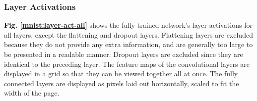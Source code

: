 \subsubsection{Layer Activations}

\textbf{Fig. \ref{mnist:layer-act-all}} shows the fully trained network's layer activations for all layers, except the flattening and dropout layers. Flattening layers are excluded because they do not provide any extra information, and are generally too large to be presented in a readable manner. Dropout layers are excluded since they are identical to the preceding layer. The feature maps of the convolutional layers are displayed in a grid so that they can be viewed together all at once. The fully connected layers are displayed as pixels laid out horizontally, scaled to fit the width of the page. \\

